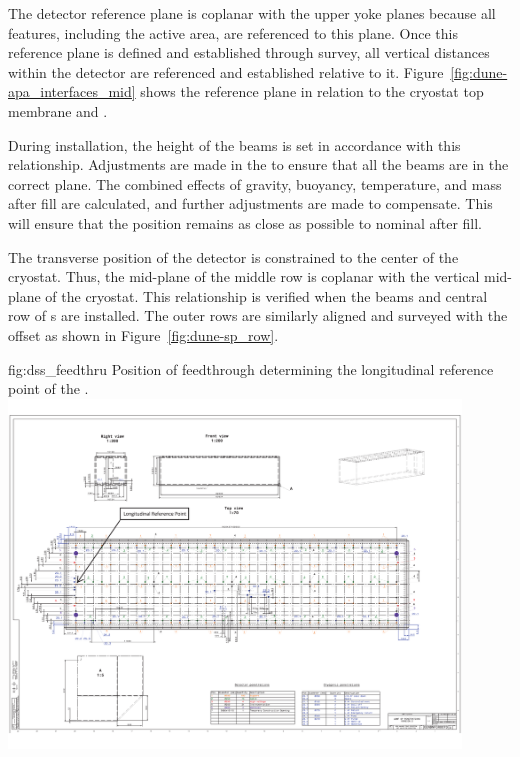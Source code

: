 The detector reference plane is coplanar with the upper 
yoke planes because all features, including the active area, are
referenced to this plane. Once this reference plane is defined and
established through survey, all vertical distances within the detector
are referenced and established relative to it.
Figure~\ref{fig:dune-apa_interfaces_mid} shows the reference plane in
relation to the cryostat top membrane and .


During installation, the height of the  beams is set in
accordance with this relationship. Adjustments are made in the
 to ensure that all the beams are in the correct plane. The
combined effects of gravity, buoyancy, temperature, and 
mass after fill are calculated, and further adjustments are made to
compensate.  This will ensure that the  position remains as
close as possible to nominal after fill.


The transverse position of the detector is constrained to the center
of the cryostat. Thus, the mid-plane of the middle row  is
coplanar with the vertical mid-plane of the cryostat. This
relationship is verified when the  beams and central row of
s are installed. The outer rows are similarly aligned and
surveyed with the offset as shown in Figure~\ref{fig:dune-sp_row}.
\begin{dunefigure}{fig:dss_feedthru}
  {Position of feedthrough determining the longitudinal reference point of the .}
  \includegraphics[width=0.9\textwidth]{graphics/SP_longitudinal_reference.pdf}
\end{dunefigure}


